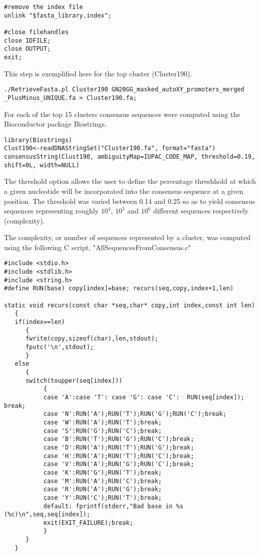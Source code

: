 \begin{footnotesize}
\begin{lstlisting}
#remove the index file 
unlink "$fasta_library.index";

#close filehandles
close IDFILE;
close OUTPUT;
exit;
\end{lstlisting}

This step is exemplified here  for the top cluster (Cluster190).

\begin{lstlisting}
./RetrieveFasta.pl Cluster190 GN20GG_masked_autoXY_promoters_merged
_PlusMinus_UNIQUE.fa > Cluster190.fa;
\end{lstlisting}

For each of the top 15 clusters consensus sequences were computed using the Bioconductor package Biostrings.

\begin{lstlisting}
library(Biostrings)
Clust190<-readDNAStringSet("Cluster190.fa", format="fasta") 
consensusString(Clust190, ambiguityMap=IUPAC_CODE_MAP, threshold=0.19,
shift=0L, width=NULL) 
\end{lstlisting}

The threshold option allows the user to define the percentage threshhold at which a given nucleotide will be incorporated into the consensus sequence at a given position. The threshold was varied between 0.14 and 0.25 so as to yield consensus sequences representing roughly $10^4$, $10^5$ and $10^6$ different sequences respectively (complexity).

The complexity, or number of sequences represented by a cluster, was computed using the following C script\cite{Lindenbaum:Online}, "AllSequencesFromConsensus.c"

\begin{lstlisting}
#include <stdio.h>
#include <stdlib.h>
#include <string.h>
#define RUN(base) copy[index]=base; recurs(seq,copy,index+1,len)

static void recurs(const char *seq,char* copy,int index,const int len)
   {
   if(index==len)
      {
      fwrite(copy,sizeof(char),len,stdout);
      fputc('\n',stdout);
      }
   else
      {
      switch(toupper(seq[index]))
           {
           case 'A':case 'T': case 'G': case 'C':  RUN(seq[index]); break;
           case 'N':RUN('A');RUN('T');RUN('G');RUN('C');break;
           case 'W':RUN('A');RUN('T');break;
           case 'S':RUN('G');RUN('C');break;
           case 'B':RUN('T');RUN('G');RUN('C');break;
           case 'D':RUN('A');RUN('T');RUN('G');break;
           case 'H':RUN('A');RUN('T');RUN('C');break;
           case 'V':RUN('A');RUN('G');RUN('C');break;
           case 'K':RUN('G');RUN('T');break;
           case 'M':RUN('A');RUN('C');break;
           case 'R':RUN('A');RUN('G');break;
           case 'Y':RUN('C');RUN('T');break;
           default: fprintf(stderr,"Bad base in %s (%c)\n",seq,seq[index]);
           exit(EXIT_FAILURE);break;
           }
      }
   }


\end{lstlisting}
\end{footnotesize}
